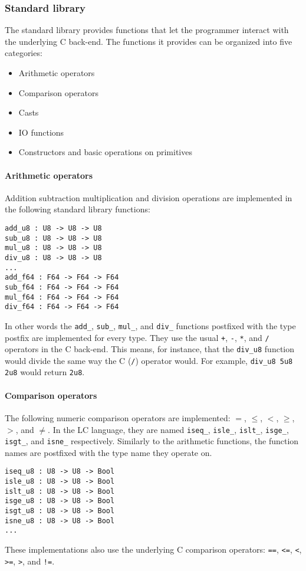 \documentclass[12pt]{article}
\begin{document}
\subsubsection{Standard library}

The standard library provides functions that let the programmer interact with
the underlying C back-end. The functions it provides can be organized into five
categories:
\begin{itemize}
    \item Arithmetic operators
    \item Comparison operators
    \item Casts
    \item IO functions
    \item Constructors and basic operations on primitives
\end{itemize}

\paragraph{Arithmetic operators} Addition subtraction multiplication and
division operations are implemented in the following standard library functions:
\begin{lstlisting}
add_u8 : U8 -> U8 -> U8
sub_u8 : U8 -> U8 -> U8
mul_u8 : U8 -> U8 -> U8
div_u8 : U8 -> U8 -> U8
...
add_f64 : F64 -> F64 -> F64
sub_f64 : F64 -> F64 -> F64
mul_f64 : F64 -> F64 -> F64
div_f64 : F64 -> F64 -> F64
\end{lstlisting}
In other words the \verb$add_$, \verb$sub_$, \verb$mul_$, and \verb$div_$
functions postfixed with the type postfix are implemented for every type. They
use the usual \verb$+$, \verb$-$, \verb$*$, and \verb$/$ operators in the C
back-end. This means, for instance, that the \verb$div_u8$ function would divide
the same way the C (\verb$/$) operator would. For example, \verb$div_u8 5u8 2u8$
would return \verb$2u8$.

\paragraph{Comparison operators} The following numeric comparison operators are
implemented: $=$, $\le$, $<$, $\ge$, $>$, and $\ne$. In the LC language, they
are named \verb$iseq_$, \verb$isle_$, \verb$islt_$, \verb$isge_$, \verb$isgt_$,
and \verb$isne_$ respectively. Similarly to the arithmetic functions, the
function names are postfixed with the type name they operate on.
\begin{lstlisting}
iseq_u8 : U8 -> U8 -> Bool
isle_u8 : U8 -> U8 -> Bool
islt_u8 : U8 -> U8 -> Bool
isge_u8 : U8 -> U8 -> Bool
isgt_u8 : U8 -> U8 -> Bool
isne_u8 : U8 -> U8 -> Bool
...
\end{lstlisting}
These implementations also use the underlying C comparison operators: \verb$==$,
\verb$<=$, \verb$<$, \verb$>=$, \verb$>$, and \verb$!=$.
\end{document}
